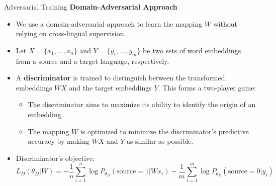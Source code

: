 \documentclass[]{beamer}
\begin{document}
\begin{frame}{Adversarial Training}
    \small
    \textbf{Domain-Adversarial Approach}
    \begin{itemize}
        \item We use a domain-adversarial approach to learn the mapping $W$ without relying on cross-lingual supervision.
        \item Let $X = \{x_1, \ldots, x_n\}$ and $Y = \{y_1, \ldots, y_m\}$ be two sets of word embeddings from a source and a target language, respectively.
        \item A \textbf{discriminator} is trained to distinguish between the transformed embeddings $WX$ and the target embeddings $Y$. This forms a two-player game:
        \begin{itemize}
            \item The discriminator aims to maximize its ability to identify the origin of an embedding.
            \item The mapping $W$ is optimized to minimize the discriminator's predictive accuracy by making $WX$ and $Y$ as similar as possible.
        \end{itemize}
        \item Discriminator's objective:
        \scriptsize
        \begin{equation}
            L_D(\theta_D | W) = - \frac{1}{n} \sum_{i=1}^n \log P_{\theta_D}(\text{source} = 1 | W x_i) - \frac{1}{m} \sum_{i=1}^m \log P_{\theta_D}(\text{source} = 0 | y_i)
        \end{equation}
	\small
    \end{itemize}
\end{frame}
\end{document}
